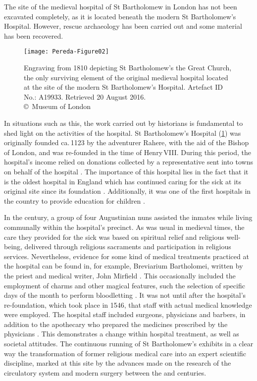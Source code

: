 %
The site of the medieval hospital of St Bartholomew in London has not been excavated completely, as it is located beneath the modern St Bartholomew’s Hospital. However, rescue archaeology has been carried out and some material has been recovered.
\begin{figure}[!b]
		\texttt{[image: Pereda-Figure02]}
		\caption{Engraving from 1810 depicting St Bartholomew’s the Great Church, the only surviving element of the original medieval hospital located at the site of the modern St Bartholomew’s Hospital. Artefact ID No.: A19933. Retrieved 20 August 2016.
		{\normalfont\scriptsize \\ \copyright\ Museum of London}}
		\label{fig:Pereda-Figure02}
\end{figure}
In situations such as this, the work carried out by historians is fundamental to shed light on the activities of the hospital. St Bartholomew’s Hospital (\cref{fig:Pereda-Figure02}) %
was originally founded ca.\,1123 by the adventurer Rahere, with the aid of the Bishop of London, and was re-founded in the time of Henry\,VIII. During this period, the hospital’s income relied on donations collected by a representative sent into towns on behalf of the hospital \parencite[19,42]{Dainton_1961}. 
The importance of this hospital lies in the fact that it is the oldest hospital in England which has continued caring for the sick at its original site since its foundation \parencite[35]{Dainton_1961}. 
Additionally, it was one of the first hospitals in the country to provide education for children \parencite[21]{Rawcliffe_1999}. 


In the  century\AD, a group of four Augustinian nuns assisted the inmates while living communally within the hospital’s precinct. As was usual in medieval times, the care they provided for the sick was based on spiritual relief and religious well-being, delivered through religious sacraments and participation in religious services. 
Nevertheless, evidence for some kind of medical treatments practiced at the hospital can be found in, for example, Breviarium Bartholomei, written by the priest and medical writer, John Mirfield \parencite[36-37]{Dainton_1961}. 
This occasionally included the employment of charms and other magical features, such the selection of specific days of the month to perform bloodletting \parencite[35-36]{Rider_2012}. 
It was not until after the hospital’s re-foundation, which took place in 1546, that staff with actual medical knowledge were employed. The hospital staff included surgeons, physicians and barbers, in addition to the apothecary who prepared the medicines prescribed by the physicians \parencite[38-39]{Dainton_1961}. This demonstrates a change within hospital treatment, as well as societal attitudes.  
The continuous running of St Bartholomew’s exhibits in a clear way the transformation of former religious medical care into an expert scientific discipline, marked at this site by the advances made on the research of the circulatory system and modern surgery between the  and  centuries.
\IJSRAseparator

